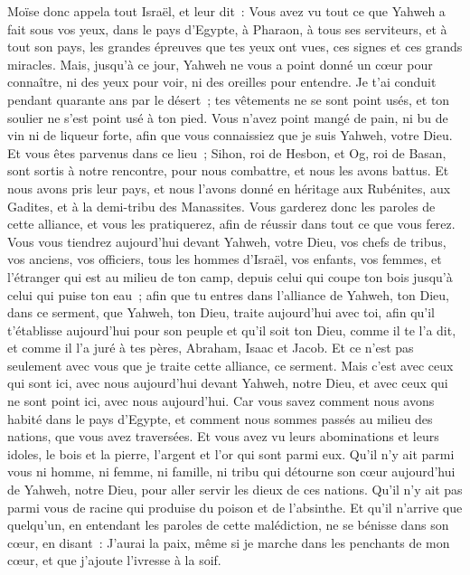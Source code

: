 \begin{multicols}{2}
Moïse donc appela tout Israël, et leur dit~: Vous avez vu tout ce que Yahweh a fait sous vos yeux, dans le pays d'Egypte, à Pharaon, à tous ses serviteurs, et à tout son pays,
les grandes épreuves que tes yeux ont vues, ces signes et ces grands miracles.
Mais, jusqu'à ce jour, Yahweh ne vous a point donné un cœur pour connaître, ni des yeux pour voir, ni des oreilles pour entendre.
Je t'ai conduit pendant quarante ans par le désert~; tes vêtements ne se sont point usés, et ton soulier ne s'est point usé à ton pied.
Vous n'avez point mangé de pain, ni bu de vin ni de liqueur forte, afin que vous connaissiez que je suis Yahweh, votre Dieu.
Et vous êtes parvenus dans ce lieu~; Sihon, roi de Hesbon, et Og, roi de Basan, sont sortis à notre rencontre, pour nous combattre, et nous les avons battus.
Et nous avons pris leur pays, et nous l'avons donné en héritage aux Rubénites, aux Gadites, et à la demi-tribu des Manassites.
Vous garderez donc les paroles de cette alliance, et vous les pratiquerez, afin de réussir dans tout ce que vous ferez.
Vous vous tiendrez aujourd'hui devant Yahweh, votre Dieu, vos chefs de tribus, vos anciens, vos officiers, tous les hommes d'Israël,
vos enfants, vos femmes, et l'étranger qui est au milieu de ton camp, depuis celui qui coupe ton bois jusqu'à celui qui puise ton eau~;
afin que tu entres dans l'alliance de Yahweh, ton Dieu, dans ce serment, que Yahweh, ton Dieu, traite aujourd'hui avec toi,
afin qu'il t'établisse aujourd'hui pour son peuple et qu'il soit ton Dieu, comme il te l'a dit, et comme il l'a juré à tes pères, Abraham, Isaac et Jacob.
Et ce n'est pas seulement avec vous que je traite cette alliance, ce serment.
Mais c'est avec ceux qui sont ici, avec nous aujourd'hui devant Yahweh, notre Dieu, et avec ceux qui ne sont point ici, avec nous aujourd'hui.
Car vous savez comment nous avons habité dans le pays d'Egypte, et comment nous sommes passés au milieu des nations, que vous avez traversées.
Et vous avez vu leurs abominations et leurs idoles, le bois et la pierre, l'argent et l'or qui sont parmi eux.
Qu'il n'y ait parmi vous ni homme, ni femme, ni famille, ni tribu qui détourne son cœur aujourd'hui de Yahweh, notre Dieu, pour aller servir les dieux de ces nations. Qu'il n'y ait pas parmi vous de racine qui produise du poison et de l'absinthe.
Et qu'il n'arrive que quelqu'un, en entendant les paroles de cette malédiction, ne se bénisse dans son cœur, en disant~: J'aurai la paix, même si je marche dans les penchants de mon cœur, et que j'ajoute l'ivresse à la soif.

\end{multicols}
